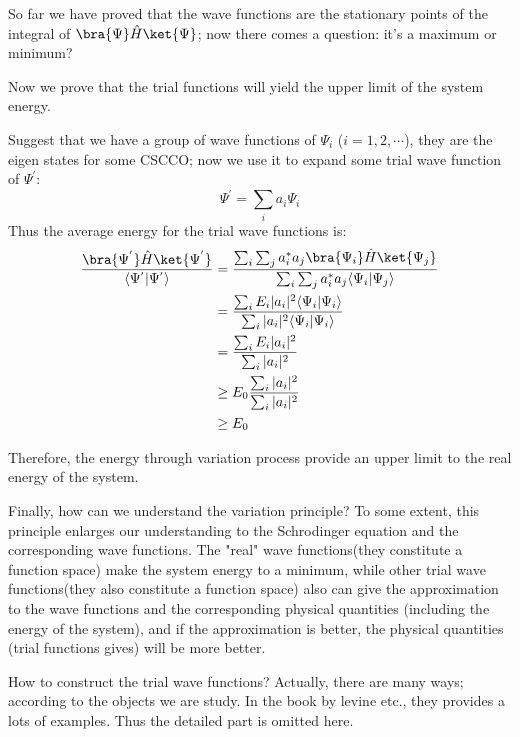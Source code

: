 So far we have proved that the wave functions are the stationary
points of the integral of $\bra{\Psi}\hat{H}\ket{\Psi}$; now there
comes a question: it's a maximum or minimum?

Now we prove that the trial functions will yield the upper limit of
the system energy.

Suggest that we have a group of wave functions of $\Psi_{i}$
($i=1,2,\cdots$), they are the eigen states for some CSCCO; now we
use it to expand some trial wave function of $\Psi^{'}$:
\begin{equation}\label{SEeq:18}
\Psi^{'} = \sum_{i}a_{i}\Psi_{i}
\end{equation}
Thus the average energy for the trial wave functions is:
\begin{align}\label{}
\frac{\bra{\Psi^{'}}\hat{H}\ket{\Psi^{'}}}{\langle\Psi^{'}|\Psi^{'}\rangle}
&=\frac{\sum_{i}\sum_{j}a^{*}_{i}a_{j}\bra{\Psi_{i}}\hat{H}\ket{\Psi_{j}}}
{\sum_{i}\sum_{j}a^{*}_{i}a_{j}\langle\Psi_{i}|\Psi_{j}\rangle}
\nonumber \\
&=\frac{\sum_{i}E_{i}|a_{i}|^{2}\langle\Psi_{i}|\Psi_{i}\rangle}
{\sum_{i}|a_{i}|^{2}\langle\Psi_{i}|\Psi_{i}\rangle} \nonumber \\
&=\frac{\sum_{i}E_{i}|a_{i}|^{2}}{\sum_{i}|a_{i}|^{2}} \nonumber \\
&\geq E_{0}\frac{\sum_{i}|a_{i}|^{2}}{\sum_{i}|a_{i}|^{2}} \nonumber \\
&\geq E_{0}
\end{align}

Therefore, the energy through variation process provide an upper
limit to the real energy of the system.

Finally, how can we understand the variation principle? To some
extent, this principle enlarges our understanding to the Schrodinger
equation and the corresponding wave functions. The "real" wave
functions(they constitute a function space) make the system energy
to a minimum, while other trial wave functions(they also constitute
a function space) also can give the approximation to the wave
functions and the corresponding physical quantities (including the
energy of the system), and if the approximation is better, the
physical quantities (trial functions gives) will be more better.

How to construct the trial wave functions? Actually, there are many
ways; according to the objects we are study. In the book by levine
etc.\cite{levine, aoqingTang}, they provides a lots of examples.
Thus the detailed part is omitted here.

